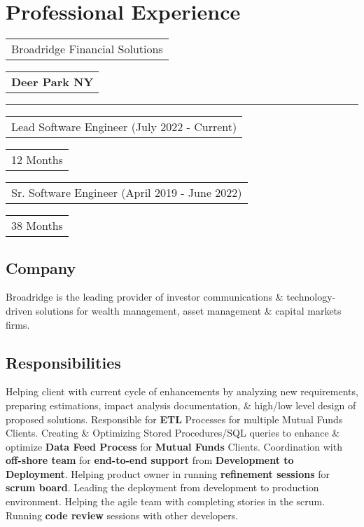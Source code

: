 \documentclass[letterpaper,11pt]{article}
\begin{document}
\section{Professional Experience}


    \noindent
    \begin{tabular}[t]{@{}l}
    \Large{Broadridge Financial Solutions}
    \end{tabular}
    \hfill
    \begin{tabular}[t]{l@{}}
    \textbf{\color{darkgray}Deer Park NY}
    \end{tabular}
    \noindent\rule{\textwidth}{0.5pt}
    \begin{tabular}[t]{@{}l}
    Lead Software Engineer (July 2022 - Current)
    \end{tabular}
    \hfill
    \begin{tabular}[t]{l@{}}
    	12 Months
    \end{tabular}
    \begin{tabular}[t]{@{}l}
    	Sr. Software Engineer (April 2019 - June 2022)
    \end{tabular}
    \hfill
    \begin{tabular}[t]{l@{}}
    	38 Months
    \end{tabular}

    \subsection{Company}
    Broadridge is the leading provider of investor communications \& technology-driven solutions for wealth management, asset management \& capital markets firms.

    \subsection{Responsibilities}
    Helping client with current cycle of enhancements by analyzing new requirements, preparing estimations, impact analysis documentation, \& high/low level design of proposed solutions. Responsible for \textbf{\color{darkgray}ETL} Processes for multiple Mutual Funds Clients. Creating \& Optimizing Stored Procedures/SQL queries to enhance \& optimize \textbf{\color{darkgray}Data Feed Process} for \textbf{\color{darkgray}Mutual Funds} Clients. Coordination with \textbf{\color{darkgray}off-shore team} for \textbf{\color{darkgray}end-to-end support} from \textbf{\color{darkgray}Development to Deployment}. Helping product owner in running \textbf{\color{darkgray}refinement sessions} for \textbf{\color{darkgray}scrum board}. Leading the deployment from development to production environment. Helping the agile team with completing stories in the scrum. Running \textbf{\color{darkgray}code review} sessions with other developers.
\end{document}
